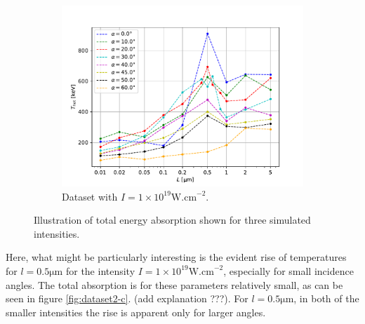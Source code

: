 \begin{figure}[t]
\begin{subfigure}{0.59\textwidth}
		\centering
		\includegraphics[width=\textwidth]{figures/t_hot_l_19}
		\caption{Dataset with $I = 1 \times 10^{19} \mathrm{W.cm}^{-2}$.}
		\label{fig:dataset3-c}
	\end{subfigure}
	\caption{Illustration of total energy absorption shown for three simulated intensities.}
	\label{fig:dataset3}
\end{figure}

Here, what might be particularly interesting is the evident rise of temperatures for $l=0.5 \mathrm{\mu m}$ for the intensity $I = 1 \times 10^{19} \mathrm{W.cm}^{-2}$, especially for small incidence angles. The total absorption is for these parameters relatively small, as can be seen in figure \ref{fig:dataset2-c}. (add explanation ???). For $l=0.5 \mathrm{\mu m}$, in  both of the smaller intensities the rise is apparent only for larger angles.